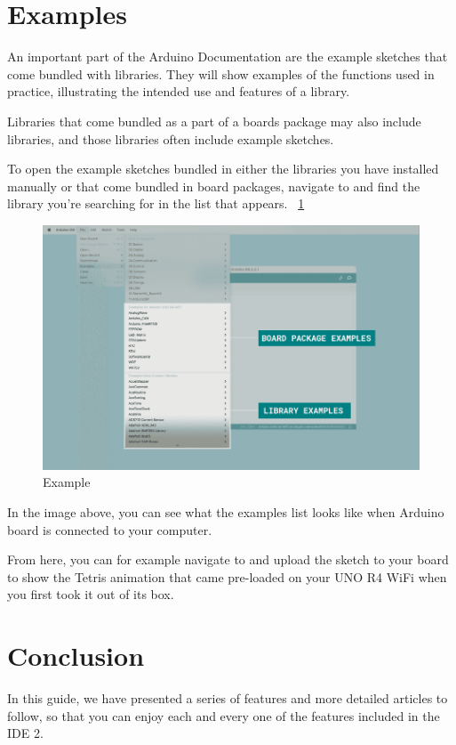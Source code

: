 	
\section{Examples}
An important part of the Arduino Documentation are the example sketches that come bundled with libraries. They will show examples of the functions used in practice, illustrating the intended use and features of a library.

Libraries that come bundled as a part of a boards package may also include libraries, and those libraries often include example sketches.

To open the example sketches bundled in either the libraries you have installed manually or that come bundled in board packages, navigate to  and find the library you're searching for in the list that appears. ~\ref{examplesketches}

	\begin{figure}
		\begin{center}
			\includegraphics[width=0.7\linewidth]{Images/Arduino/examplesketches.png}
			\caption{Example}
			\label{examplesketches}
		\end{center}
	\end{figure}
	
In the image above, you can see what the examples list looks like when Arduino board is connected to your computer.

From here, you can for example navigate to and upload the sketch to your board to show the Tetris animation that came pre-loaded on your UNO R4 WiFi when you first took it out of its box.
	

\section{Conclusion}
In this guide, we have presented a series of features and more detailed articles to follow, so that you can enjoy each and every one of the features included in the IDE 2.

